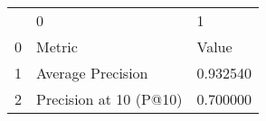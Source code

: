 \begin{tabular}{lll}
 & 0 & 1 \\
0 & Metric & Value \\
1 & Average Precision & 0.932540 \\
2 & Precision at 10 (P@10) & 0.700000 \\
\end{tabular}
